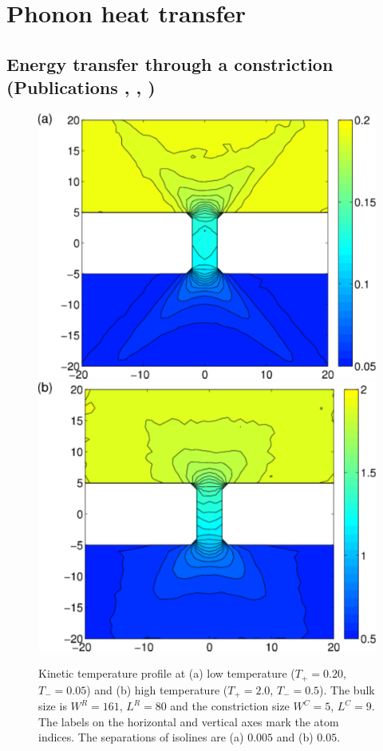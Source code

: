 

\section{Phonon heat transfer}


\subsection{Energy transfer through a constriction (Publications , , )} 


\begin{figure}
\begin{center}
 \includegraphics[width=.49\columnwidth]{pics/fpu_fig2a.pdf}
  \includegraphics[width=.49\columnwidth]{pics/fpu_fig2b.pdf}
 \caption{Kinetic temperature profile at (a) low temperature ($T_+=0.20$, $T_-=0.05$) and (b) high temperature ($T_+=2.0$, $T_-=0.5$). The bulk size is $W^R=161$, $L^R=80$ and the constriction size $W^C=5$, $L^C=9$. The labels on the horizontal and vertical axes mark the atom indices. The separations of isolines are (a) $0.005$ and (b) $0.05$.}
\label{fig:fpu_fig2}
\end{center}
\end{figure}

